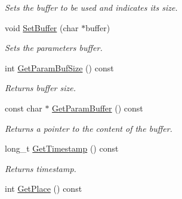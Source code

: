 \begin{DoxyCompactItemize}
\begin{DoxyCompactList}\small\item\em Sets the buffer to be used and indicates its size. \end{DoxyCompactList}\item 
\hypertarget{class_common_1_1_event_msg_a9c83946dd9eed41575874d9ceb0158f0}{void \hyperlink{class_common_1_1_event_msg_a9c83946dd9eed41575874d9ceb0158f0}{Set\-Buffer} (char $\ast$buffer)}\label{class_common_1_1_event_msg_a9c83946dd9eed41575874d9ceb0158f0}

\begin{DoxyCompactList}\small\item\em Sets the parameters buffer. \end{DoxyCompactList}\item 
\hypertarget{class_common_1_1_event_msg_af4a449ef5a8255be4d521bc75841727f}{int \hyperlink{class_common_1_1_event_msg_af4a449ef5a8255be4d521bc75841727f}{Get\-Param\-Buf\-Size} () const }\label{class_common_1_1_event_msg_af4a449ef5a8255be4d521bc75841727f}

\begin{DoxyCompactList}\small\item\em Returns buffer size. \end{DoxyCompactList}\item 
\hypertarget{class_common_1_1_event_msg_ab5a78181901292a807b71667bc500658}{const char $\ast$ \hyperlink{class_common_1_1_event_msg_ab5a78181901292a807b71667bc500658}{Get\-Param\-Buffer} () const }\label{class_common_1_1_event_msg_ab5a78181901292a807b71667bc500658}

\begin{DoxyCompactList}\small\item\em Returns a pointer to the content of the buffer. \end{DoxyCompactList}\item 
\hypertarget{class_common_1_1_event_msg_a208dcc28a9fca5e58bde25ef86e0399b}{long\-\_\-t \hyperlink{class_common_1_1_event_msg_a208dcc28a9fca5e58bde25ef86e0399b}{Get\-Timestamp} () const }\label{class_common_1_1_event_msg_a208dcc28a9fca5e58bde25ef86e0399b}

\begin{DoxyCompactList}\small\item\em Returns timestamp. \end{DoxyCompactList}\item 
\hypertarget{class_common_1_1_event_msg_ae0a26efc9d53bacf315e5950b15fb998}{int \hyperlink{class_common_1_1_event_msg_ae0a26efc9d53bacf315e5950b15fb998}{Get\-Place} () const }\label{class_common_1_1_event_msg_ae0a26efc9d53bacf315e5950b15fb998}


\end{DoxyCompactItemize}
